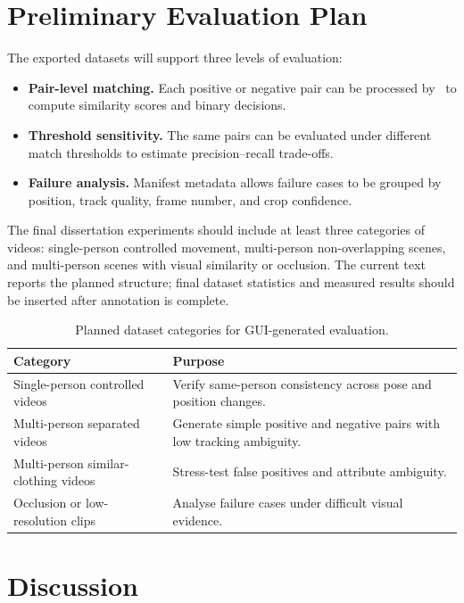 \section{Preliminary Evaluation Plan}

The exported datasets will support three levels of evaluation:

\begin{itemize}
  \item \textbf{Pair-level matching.} Each positive or negative pair can be processed by \systemname\ to compute similarity scores and binary decisions.
  \item \textbf{Threshold sensitivity.} The same pairs can be evaluated under different match thresholds to estimate precision--recall trade-offs.
  \item \textbf{Failure analysis.} Manifest metadata allows failure cases to be grouped by position, track quality, frame number, and crop confidence.
\end{itemize}

The final dissertation experiments should include at least three categories of videos: single-person controlled movement, multi-person non-overlapping scenes, and multi-person scenes with visual similarity or occlusion. The current text reports the planned structure; final dataset statistics and measured results should be inserted after annotation is complete.

\begin{table}[htbp]
  \centering
  \caption{Planned dataset categories for GUI-generated evaluation.}
  \label{tab:paper2-dataset-plan}
  \begin{tabularx}{\textwidth}{lX}
    \toprule
    Category & Purpose \\
    \midrule
    Single-person controlled videos & Verify same-person consistency across pose and position changes. \\
    Multi-person separated videos & Generate simple positive and negative pairs with low tracking ambiguity. \\
    Multi-person similar-clothing videos & Stress-test false positives and attribute ambiguity. \\
    Occlusion or low-resolution clips & Analyse failure cases under difficult visual evidence. \\
    \bottomrule
  \end{tabularx}
\end{table}

\section{Discussion}

